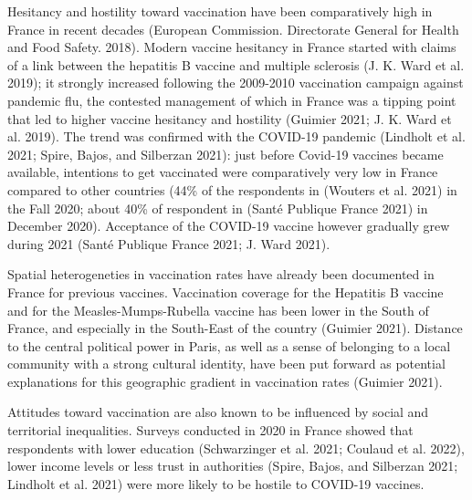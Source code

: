 \documentclass[
]{article}
\begin{document}
Hesitancy and hostility toward vaccination have been comparatively high in France in recent decades (European Commission. Directorate General for Health and Food Safety. 2018). Modern vaccine hesitancy in France started with claims of a link between the hepatitis B vaccine and multiple sclerosis (J. K. Ward et al. 2019); it strongly increased following the 2009-2010 vaccination campaign against pandemic flu, the contested management of which in France was a tipping point that led to higher vaccine hesitancy and hostility (Guimier 2021; J. K. Ward et al. 2019).
The trend was confirmed with the COVID-19 pandemic (Lindholt et al. 2021; Spire, Bajos, and Silberzan 2021): just before Covid-19 vaccines became available, intentions to get vaccinated were comparatively very low in France compared to other countries (44\% of the respondents in (Wouters et al. 2021) in the Fall 2020; about 40\% of respondent in (Santé Publique France 2021) in December 2020). Acceptance of the COVID-19 vaccine however gradually grew during 2021 (Santé Publique France 2021; J. Ward 2021).

Spatial heterogeneties in vaccination rates have already been documented in France for previous vaccines. Vaccination coverage for the Hepatitis B vaccine and for the Measles-Mumps-Rubella vaccine has been lower in the South of France, and especially in the South-East of the country (Guimier 2021). Distance to the central political power in Paris, as well as a sense of belonging to a local community with a strong cultural identity, have been put forward as potential explanations for this geographic gradient in vaccination rates (Guimier 2021).

Attitudes toward vaccination are also known to be influenced by social and territorial inequalities. Surveys conducted in 2020 in France showed that respondents with lower education (Schwarzinger et al. 2021; Coulaud et al. 2022), lower income levels or less trust in authorities (Spire, Bajos, and Silberzan 2021; Lindholt et al. 2021) were more likely to be hostile to COVID-19 vaccines.
\end{document}
